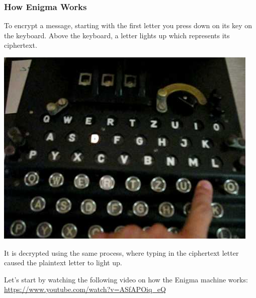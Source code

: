 \documentclass{beamer}
\newcommand{\<}{\langle}
\renewcommand{\>}{\rangle}
\begin{document}
\begin{frame}
\frametitle{How Enigma Works}
\small 
To encrypt a message, starting with the first letter you press down on its key on the keyboard. Above the keyboard, a letter lights up which represents its ciphertext.\newline

\begin{center}
\includegraphics[scale=.2]{IMG/lamp}
\end{center}

It is decrypted using the same process, where typing in the ciphertext letter caused the plaintext letter to light up.\newline

Let's start by watching the following video on how the Enigma machine works:
\url{https://www.youtube.com/watch?v=ASfAPOiq_eQ}
\end{frame}
\end{document}
